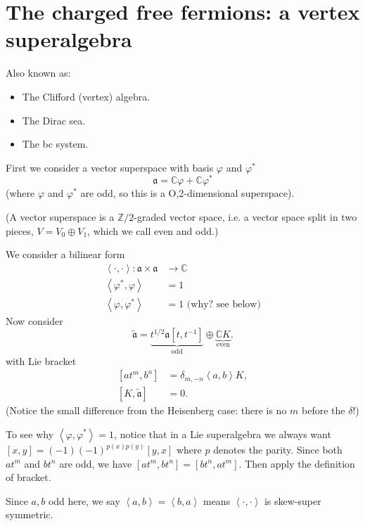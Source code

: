 \section{The charged free fermions: a vertex
superalgebra}
\label{section-charges-free-fermions}

Also known as:
\begin{itemize}
\item The Clifford (vertex) algebra.
\item The Dirac sea.
\item The bc system.
\end{itemize}

First we consider a vector
superspace with basis $\varphi$ and
$\varphi^*$
$$
\mathfrak{a}=\mathbb{C}\varphi +\mathbb{C}
\varphi^*
$$
(where $\varphi$ and $\varphi^*$ are odd,
so this is a O,2-dimensional superspace).

(A vector superspace is a
$\mathbb{Z}/2$-graded vector space,
i.e. a vector space split in two pieces,
$V=V_0\oplus V_1$, which we call even and
odd.)

We consider a bilinear form
$$
\begin{aligned}
\left\langle{}\cdot,\cdot\right\rangle{}: \mathfrak{a}\times
\mathfrak{a}
&\longrightarrow  \mathbb{C}\\
\left\langle{}\varphi^*,\varphi\right\rangle{} &=1\\
\left\langle{}\varphi,\varphi^*\right\rangle{}&=1\text{ (why?
see below)}
\end{aligned}
$$
Now consider
$$
\tilde{\mathfrak{a}}=\underbrace{t^{1/2}
\mathfrak{a}[t,t^{-1}]}_{\text{odd}}
\oplus
\underbrace{\mathbb{C}K}_{\text{even}}.
$$
with Lie bracket
$$
\begin{aligned}
[at^m,b^n]&=\delta_{m,-n}\left\langle{}a,b\right\rangle{}K,\\
[K,\tilde{\mathfrak{a}}]&=0.
\end{aligned}
$$
(Notice the small difference from the
Heisenberg case: there is no $m$ before the
$\delta$!)

To see why
$\left\langle{}\varphi,\varphi^*\right\rangle{}=1$,
notice that in a Lie superalgebra we always
want
$[x,y]=(-1)(-1)^{p(x)p(y)}[y,x]$
where $p$ denotes the parity.
Since both  $at^m$ and $bt^n$ are odd,
we have $[at^m,bt^n]=[bt^n,at^m]$.
Then apply the definition of bracket.

Since $a,b$ odd here,
we say $\left\langle{}a,b\right\rangle{}=\left\langle{}b,a\right\rangle{}$
means
$\left\langle{}\cdot,\cdot\right\rangle{}$ is skew-super
symmetric.

